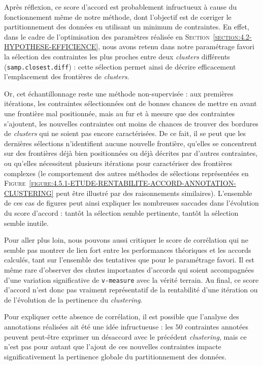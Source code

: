 			\begin{leftBarAuthorOpinion}
				Après réflexion, ce score d'accord est probablement infructueux à cause du fonctionnement même de notre méthode, dont l'objectif est de corriger le partitionnement des données en utilisant un minimum de contraintes.
				En effet, dans le cadre de l'optimisation des paramètres réalisée en \textsc{Section~\ref{section:4.2-HYPOTHESE-EFFICIENCE}}, nous avons retenu dans notre paramétrage favori la sélection des contraintes les plus proches entre deux \textit{clusters} différents (\texttt{samp.closest.diff}) : cette sélection permet ainsi de décrire efficacement l'emplacement des frontières de \textit{clusters}.
				
				Or, cet échantillonnage reste une méthode non-supervisée : aux premières itérations, les contraintes sélectionnées ont de bonnes chances de mettre en avant une frontière mal positionnée, mais au fur et à mesure que des contraintes s'ajoutent, les nouvelles contraintes ont moins de chances de trouver des bordures de \textit{clusters} qui ne soient pas encore caractérisées.
				De ce fait, il se peut que les dernières sélections n'identifient aucune nouvelle frontière, qu'elles se concentrent sur des frontières déjà bien positionnées ou déjà décrites par d'autres contraintes, ou qu'elles nécessitent plusieurs itérations pour caractériser des frontières complexes (le comportement des autres méthodes de sélections représentées en \textsc{Figure~\ref{figure:4.5.1-ETUDE-RENTABILITE-ACCORD-ANNOTATION-CLUSTERING}} peut être illustré par des raisonnements similaires).
				L'ensemble de ces cas de figures peut ainsi expliquer les nombreuses saccades dans l'évolution du score d'accord : tantôt la sélection semble pertinente, tantôt la sélection semble inutile.
			\end{leftBarAuthorOpinion}
			
			Pour aller plus loin, nous pouvons aussi critiquer le score de corrélation qui ne semble pas montrer de lien fort entre les performances théoriques et les accords calculés, tant sur l'ensemble des tentatives que pour le paramétrage favori.
			Il est même rare d'observer des chutes importantes d'accords qui soient accompagnées d'une variation significative de \texttt{v-measure} avec la vérité terrain.
			Au final, ce score d'accord n'est donc pas vraiment représentatif de la rentabilité d'une itération ou de l'évolution de la pertinence du \textit{clustering}.
			\begin{leftBarAuthorOpinion}
				Pour expliquer cette absence de corrélation, il est possible que l'analyse des annotations réalisées ait été une idée infructueuse : les $50$ contraintes annotées peuvent peut-être exprimer un désaccord avec le précédent \textit{clustering}, mais ce n'est pas pour autant que l'ajout de ces nouvelles contraintes impacte significativement la pertinence globale du partitionnement des données.
			\end{leftBarAuthorOpinion}
			

